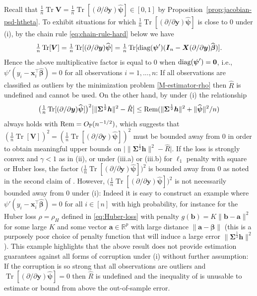 \documentclass[11pt]{amsart}
\numberwithin{equation}{section}
\numberwithin{equation}{section}
\def\real{{\mathbb{R}}}
\def\R{{\real}}
\def\P{{\mathbb{P}}}
\def\diag{\hbox{\rm diag}}
\def\Rem{\hbox{\rm Rem}}
\DeclareMathOperator{\trace}{Tr}
\def\mathbold{\boldsymbol} %
\def\ba{\mathbold{a}}\def\bfa{\mathbold{a}}\def\ahat{\widehat{a}}\def\atil{\widetilde{a}}
\def\bb{\mathbold{b}}\def\bhat{\widehat{b}}\def\btil{\widetilde{b}}
\def\bh{\mathbold{h}}\def\hhat{\widehat{h}}\def\htil{\widetilde{h}}
\def\bI{\mathbold{I}}\def\hbI{{\widehat{\bI}}}\def\tbI{{\widetilde{\bI}}}
\def\bV{\mathbold{V}}\def\hbV{{\widehat{\bV}}}\def\tbV{{\widetilde{\bV}}}
\def\bx{\mathbold{x}}\def\xhat{\widehat{x}}\def\xtil{\widetilde{x}}\def\xbar{{\overline x}}\def\vbx{{\bf x}}
\def\bX{\mathbold{X}}\def\hbX{{\widehat{\bX}}}\def\tbX{{\widetilde{\bX}}}\def\bXbar{{\overline \bX}}
\def\by{\mathbold{y}}\def\yhat{\widehat{y}}\def\ytil{\widetilde{y}}\def\ybar{{\overline y}}\def\vby{{\bf y}}
\def\bbeta{\mathbold{\beta}}\def\betahat{\widehat{\beta}}\def\hbeta{\widehat{\beta}}
\def\hbbeta{{{\widehat{\bbeta}}}}
\def\bSigma{\mathbold{\Sigma}}\def\hbSigma{{\widehat{\bSigma}}}
\def\bpsi{\mathbold{\psi}}\def\psihat{\widehat{\psi}}\def\hpsi{\widehat{\psi}}
\def\hbpsi{{\widehat{\bpsi}}}\def\tbpsi{{\widetilde{\bpsi}}}
\begin{document}
Recall that $\frac 1 n \trace\bV = \frac 1 n \trace[(\partial/\partial\by)\hbpsi] \in [0,1]$
by Proposition~\ref{prop:jacobian-psd-htheta}.
To exhibit situations for which 
$\frac 1 n \trace[(\partial/\partial\by)\hbpsi]$ is close to 0
under (i),
by the chain rule \eqref{eq:chain-rule-hard}
below we have
\begin{equation*}
    \tfrac 1 n \trace[\bV] = 
\tfrac 1 n \trace[(\partial/\partial\by)\hbpsi]
=
\tfrac 1 n \trace[\diag(\bpsi')(\bI_n - \bX (\partial/\partial\by)\hbbeta)].
\end{equation*}
Hence the above multiplicative factor is equal to 0
when $\diag(\bpsi') = \mathbf{0}$, i.e., $\psi'(y_i -\bx_i^\top\hbbeta) = 0$
for all observations $i=1,...,n$: If all observations are classified as outliers
by the minimization problem \eqref{M-estimator-rho} then
$\hat R$ is undefined and cannot be used. On the other hand, by  under (i)
the relationship
\begin{equation}
    \label{eq:previous-display-upper-bound-hat-R}
\bigl(\tfrac 1 n \trace[(\partial/\partial\by)\hbpsi]\bigr)^2
\big|\|\bSigma^{\frac12}\bh\|^2  - \hat R\big|
\le\Rem (\|\bSigma^{\frac12}\bh\|^2 + \|\hbpsi\|^2/n)
\end{equation}
always holds with $\Rem=O_\P(n^{-1/2})$, which suggests that
$(\frac 1 n \trace[\bV])^2 = (\frac 1 n \trace[(\partial/\partial\by)\hbpsi])^2$
must be bounded away from 0 in order to obtain meaningful upper bounds
on $\big|\|\bSigma^{\frac12}\bh\|^2  - \hat R\big|$.
If the loss is strongly convex and $\gamma<1$
as in (ii),
or under (iii.a) or (iii.b)
for $\ell_1$ penalty with square or Huber loss, the factor
$\big(\frac 1 n \trace[(\partial/\partial\by)\hbpsi]\big)^2$
is bounded away from 0 as noted in the second claim
of .
However, $\big(\frac 1 n \trace[(\partial/\partial\by)\hbpsi]\big)^2$
is not necessarily bounded away from 0 under
(i): Indeed it is easy to construct an example
where $\psi'(y_i - \bx_i^\top\hbbeta)=0$ for all $i\in[n]$
with high probability, for instance for the Huber loss
$\rho=\rho_H$ defined in \eqref{eq:Huber-loss}
with penalty
$g(\bb)=K\|\bb-\ba\|^2$ for some large $K$ and some vector $\ba\in\R^p$
with large distance $\|\ba-\bbeta\|$
(this is a purposely poor choice of penalty function that will induce
a large error $\|\bSigma^{\frac12}\bh\|^2$).
This example highlights that the above result does not provide
estimation guarantees against all forms of corruption
under (i) without further assumption:
If the corruption is so strong that all observations are outliers and
$\trace[(\partial/\partial\by) \hbpsi] = 0$ then
$\hat R$ is undefined and
the inequality of  is unusable to estimate
or bound from above the out-of-sample error.
\end{document}

